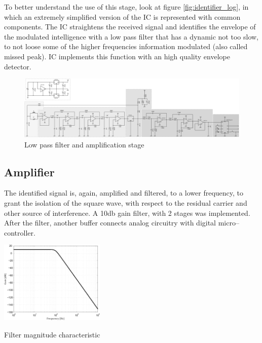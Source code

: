 To better understand the use of this stage, look at figure \ref{fig:identifier_log}, in which an extremely simplified version of the IC is represented with common components. The IC straightens the received signal and identifies the envelope of the modulated intelligence with a low pass filter that has a dynamic not too slow, to not loose some of the higher frequencies information modulated (also called missed peak). IC implements this function with an high quality envelope detector.
\begin{figure}[h]
	\centering
	\includegraphics*[viewport=1443 3 2320 350,scale=0.4]{ch2/img/receiver3.pdf}
	\caption{Low pass filter and amplification stage}
	\label{fig:filter2}
	\forceversofloat
\end{figure}

\subsection{Amplifier}

The identified signal is, again, amplified and filtered, to a lower frequency, to grant the isolation of the square wave, with respect to the residual carrier and other source of interference. A \num{10}\si{\decibel} gain filter, with 2 stages was implemented. After the filter, another buffer connects analog circuitry with digital micro--controller.
\begin{marginfigure}
	\centering
	\includegraphics[width=5cm]{ch2/img/filter2.pdf}
	\caption{Filter magnitude characteristic}
\end{marginfigure}


